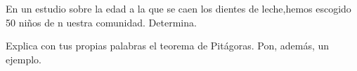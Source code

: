 \documentclass[addpoints,spanish, 12pt,a4paper]{exam}
\begin{document}
\begin{questions}
\addpoints


\question[2] En un estudio sobre la edad a la que se caen los dientes de leche,hemos escogido 50 niños de n uestra comunidad. Determina.
\noaddpoints %
\addpoints

\question[1]
Explica con tus propias palabras el teorema de Pitágoras. Pon, además, un ejemplo.
\makeemptybox{\fill}


\end{questions}
\end{document}
